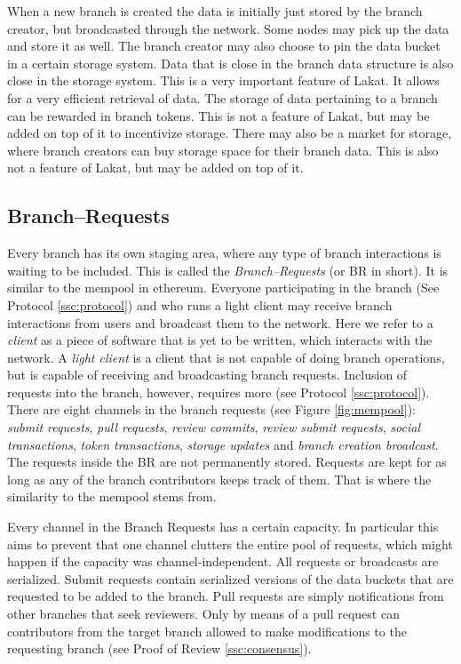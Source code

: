 When a new branch is created the data is initially just stored by the branch creator, but broadcasted through the network. Some nodes may pick up the data and store it as well. The branch creator may also choose to pin the data bucket in a certain storage system. Data that is close in the branch data structure is also close in the storage system. This is a very important feature of Lakat. It allows for a very efficient retrieval of data. The storage of data pertaining to a branch can be rewarded in branch tokens. This is not a feature of Lakat, but may be added on top of it to incentivize storage. There may also be a market for storage, where branch creators can buy storage space for their branch data. This is also not a feature of Lakat, but may be added on top of it.

\subsection{Branch--Requests}
\label{ssc:branchrequests}

Every branch has its own staging area, where any type of branch interactions is waiting to be included. This is called the \textit{Branch--Requests} (or BR in short). It is similar to the mempool in ethereum. Everyone participating in the branch (See Protocol \ref{ssc:protocol}) and who runs a light client may receive branch interactions from users and broadcast them to the network. Here we refer to a \textit{client} as a piece of software that is yet to be written, which interacts with the network. A \textit{light client} is a client that is not capable of doing branch operations, but is capable of receiving and broadcasting branch requests. Inclusion of requests into the branch, however, requires more (see Protocol \ref{ssc:protocol}). There are eight channels in the branch requests (see Figure \ref{fig:mempool}): \textit{submit requests}, \textit{pull requests}, \textit{review commits}, \textit{review submit requests}, \textit{social transactions}, \textit{token transactions}, \textit{storage updates} and \textit{branch creation broadcast}. The requests inside the BR are not permanently stored. Requests are kept for as long as any of the branch contributors keeps track of them. That is where the similarity to the mempool stems from.

Every channel in the Branch Requests has a certain capacity. In particular this aims to prevent that one channel clutters the entire pool of requests, which might happen if the capacity was channel-independent. All requests or broadcasts are serialized. 
Submit requests contain serialized versions of the data buckets that are requested to be added to the branch. Pull requests are simply notifications from other branches that seek reviewers. Only by means of a pull request can contributors from the target branch allowed to make modifications to the requesting branch (see Proof of Review \ref{ssc:consensus}).


